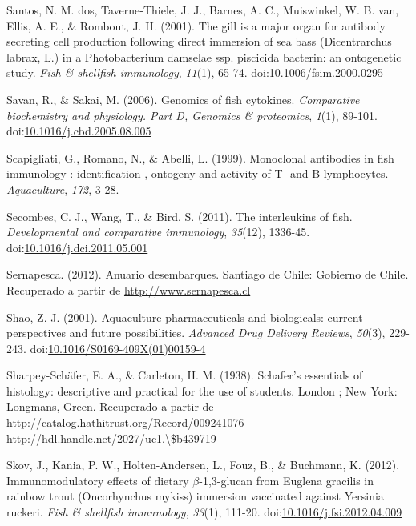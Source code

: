 \documentclass[12pt,letterpaper,oneside]{scrbook}
\begin{document}
Santos, N. M. dos, Taverne-Thiele, J. J., Barnes, A. C., Muiswinkel, W.
B. van, Ellis, A. E., \& Rombout, J. H. (2001). The gill is a major
organ for antibody secreting cell production following direct immersion
of sea bass (Dicentrarchus labrax, L.) in a Photobacterium damselae ssp.
piscicida bacterin: an ontogenetic study. \emph{Fish \& shellfish
immunology}, \emph{11}(1), 65-74.
doi:\href{http://dx.doi.org/10.1006/fsim.2000.0295}{10.1006/fsim.2000.0295}

Savan, R., \& Sakai, M. (2006). Genomics of fish cytokines.
\emph{Comparative biochemistry and physiology. Part D, Genomics \&
proteomics}, \emph{1}(1), 89-101.
doi:\href{http://dx.doi.org/10.1016/j.cbd.2005.08.005}{10.1016/j.cbd.2005.08.005}

Scapigliati, G., Romano, N., \& Abelli, L. (1999). Monoclonal antibodies
in fish immunology : identification , ontogeny and activity of T- and
B-lymphocytes. \emph{Aquaculture}, \emph{172}, 3-28.

Secombes, C. J., Wang, T., \& Bird, S. (2011). The interleukins of fish.
\emph{Developmental and comparative immunology}, \emph{35}(12), 1336-45.
doi:\href{http://dx.doi.org/10.1016/j.dci.2011.05.001}{10.1016/j.dci.2011.05.001}

Sernapesca. (2012). Anuario desembarques. Santiago de Chile: Gobierno de
Chile. Recuperado a partir de \url{http://www.sernapesca.cl}

Shao, Z. J. (2001). Aquaculture pharmaceuticals and biologicals: current
perspectives and future possibilities. \emph{Advanced Drug Delivery
Reviews}, \emph{50}(3), 229-243.
doi:\href{http://dx.doi.org/10.1016/S0169-409X(01)00159-4}{10.1016/S0169-409X(01)00159-4}

Sharpey-Schäfer, E. A., \& Carleton, H. M. (1938). Schafer's essentials
of histology: descriptive and practical for the use of students. London
; New York: Longmans, Green. Recuperado a partir de
\href{http://catalog.hathitrust.org/Record/009241076 http://hdl.handle.net/2027/uc1./\$b439719}{http://catalog.hathitrust.org/Record/009241076 http://hdl.handle.net/2027/uc1.\textbackslash{}\$b439719}

Skov, J., Kania, P. W., Holten-Andersen, L., Fouz, B., \& Buchmann, K.
(2012). Immunomodulatory effects of dietary \(\beta\)-1,3-glucan from
Euglena gracilis in rainbow trout (Oncorhynchus mykiss) immersion
vaccinated against Yersinia ruckeri. \emph{Fish \& shellfish
immunology}, \emph{33}(1), 111-20.
doi:\href{http://dx.doi.org/10.1016/j.fsi.2012.04.009}{10.1016/j.fsi.2012.04.009}
\end{document}

